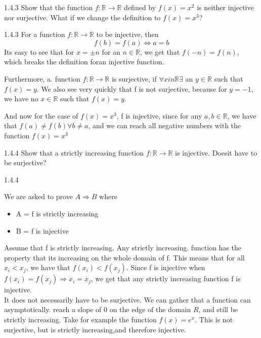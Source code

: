 \documentclass[a4paper,norsk]{article}
\begin{document}
\begin{oppgavebox}{1.4.3}{}
Show that the function $ f: \mathbb{R} \rightarrow \mathbb{R} $ defined by $ f(x) = x^2 $  is neither injective nor surjective. What if we change the definition to $ f(x) = x^3 $?

\begin{proofbox}{1.4.3}{}
  For a function $ f: \mathbb{R} \rightarrow \mathbb{R} $ to be injective, then 
  $$ f(b) = f(a) \iff a = b $$
  Its easy to see that for $ x = \pm n $ for an $ n \in \mathbb{R} $, we get that $ f(-n) = f(n) $, which breaks the definition foran injective function.
  
  Furthermore, a. function $ f: \mathbb{R} \rightarrow \mathbb{R} $ is surjective,  if $ \forall x in \mathbb{R} \exists  $ an $ y \in \mathbb{R} $  such that $ f(x) = y $. We also see very quickly that f is not surjective, because for $ y = -1 $, we have no $ x \in \mathbb{R} $  such that $ f(x) = y $.


  And now for the case of $ f(x) = x^3 $, f is injective, since for any $ a, b \in \mathbb{R} $, we have that $ f(a) \neq f(b) \forall b \neq a $, and we can reach all negative numbers with the function $ f(x) = x^3 $ 
\end{proofbox}
\end{oppgavebox}

\begin{oppgavebox}{1.4.4}{}
Show that a strictly increasing function $ f: \mathbb{R} \rightarrow \mathbb{R} $ is injective. Doesit have to be surjective?

\begin{proofbox}{1.4.4}{}

  We are asked to prove $ A \Rightarrow B $ where 
  \begin{itemize}
    \item A = f is strictly increasing
    \item B = f is injective
  \end{itemize}
  Assume that f is strictly increasing. Any strictly increasing. function has the property that its increasing on the whole domain of f. This means that for all $ x_i < x_j $, we have that $ f(x_i) < f(x_j) $. Since f is injective when $ f(x_i) = f(x_j) \Rightarrow x_i = x_j$, we get that any strictly increasing function f is injective.\\
  
  It does not necessarily have to be surjective. We can gather that a function can asymptotically. reach a slope of $ 0 $ on the edge of the domain $ R $,  and still be strictly increasing. Take for example the function $ f(x) = e^x $. This is not surjective, but is strictly increasing,and therefore injective.
\end{proofbox}
\end{oppgavebox}
\end{document}
